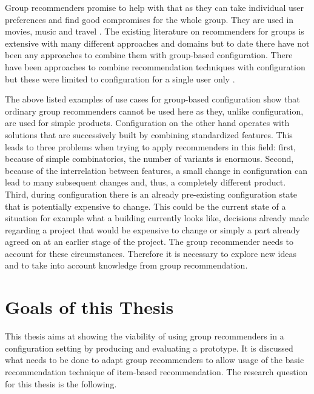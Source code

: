 Group recommenders promise to help with that as they can take individual user preferences and find good compromises for the whole group. They are used in movies, music and travel \cite{garciaGroupRecommenderSystem2009, piliponyte2013sequential, peraGroupRecommenderMovies2013,felfernigGroupRecommenderApplications2018}. The existing literature on recommenders for groups is extensive with many different approaches and domains \cite{delicResearchMethodsGroup2016, chenInterfaceInteractionDesign2011, atasItemRecommendationUsing2017, jamesonRecommendationGroups2007, chenEmpatheticonsDesigningEmotion2014, liuCGSPAComprehensiveGroup2019} but to date there have not been any approaches to combine them with group-based configuration. There have been approaches to combine recommendation techniques with configuration but these were limited to configuration for a single user only \cite{pereiraFeatureBasedPersonalizedRecommender2016, scholzConfigurationbasedRecommenderSystem2017, scholzEffectsDecisionSpace2017}.


The above listed examples of use cases for group-based configuration show that ordinary group recommenders cannot be used here as they, unlike configuration, are used for simple products. Configuration on the other hand operates with solutions that are successively built by combining standardized features. This leads to three problems when trying to apply recommenders in this field: first, because of simple combinatorics, the number of variants is enormous. Second, because of the interrelation between features, a small change in configuration can lead to many subsequent changes and, thus, a completely different product. Third, during configuration there is an already pre-existing configuration state that is potentially expensive to change. This could be the current state of a situation for example what a building currently looks like, decisions already made regarding a project that would be expensive to change or simply a part already agreed on at an earlier stage of the project. The group recommender needs to account for these circumstances. Therefore it is necessary to explore new ideas and to take into account knowledge from group recommendation.

\section{Goals of this Thesis}
\label{sec:Introduction:Goals}

This thesis aims at showing the viability of using group recommenders in a configuration setting by producing and evaluating a prototype. It is discussed what needs to be done to adapt group recommenders to allow usage of the basic recommendation technique of item-based recommendation. The research question for this thesis is the following.

